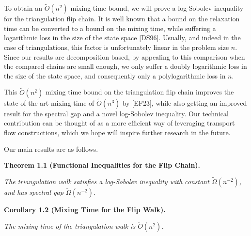 To obtain an $\widetilde{O}(n^{2})$ mixing time bound, we will prove a log-Sobolev inequality for the triangulation flip chain. It is well known that a bound on the relaxation time can be converted to a bound on the mixing time, while suffering a logarithmic loss in the size of the state space [DS96]. Usually, and indeed in the case of triangulations, this factor is unfortunately linear in the problem size $n$. Since our results are decomposition based, by appealing to this comparison when the compared chains are small enough, we only suffer a doubly logarithmic loss in the size of the state space, and consequently only a polylogarithmic loss in $n$.\par




This $\widetilde{O}(n^{2})$ mixing time bound on the triangulation flip chain improves the state of the art mixing time of $\widetilde{O}(n^{3})$ by [EF23], while also getting an improved result for the spectral gap and a novel log-Sobolev inequality. Our technical contribution can be thought of as a more efficient way of leveraging transport flow constructions, which we hope will inspire further research in the future.\par




Our main results are as follows.\par





\par\medskip\noindent\textbf{\textbf{Theorem 1.1}\textbf{ }(Functional Inequalities for the Flip Chain)\textbf{.}}\par



\emph{The triangulation walk satisfies a log-Sobolev inequality with constant $\widetilde{\Omega}(n^{-2})$, and has spectral gap $\widetilde{\Omega}(n^{-2})$.}\par







\par\medskip\noindent\textbf{\textbf{Corollary 1.2}\textbf{ }(Mixing Time for the Flip Walk)\textbf{.}}\par



\emph{The mixing time of the triangulation walk is $\widetilde{O}(n^{2})$.}\par



